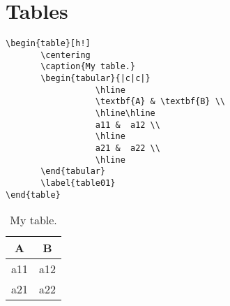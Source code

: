 \chapter{Tables}

\begin{verbatim}
\begin{table}[h!]
       \centering
       \caption{My table.}
       \begin{tabular}{|c|c|}
                  \hline
                  \textbf{A} & \textbf{B} \\
                  \hline\hline
                  a11 &  a12 \\
                  \hline
                  a21 &  a22 \\
                  \hline
       \end{tabular}
       \label{table01}
\end{table}
\end{verbatim}

\begin{table}[h!]
	\centering
	\caption{My table.}
	\begin{tabular}{|c|c|}
	    	\hline
	    	\textbf{A} & \textbf{B} \\
	    	\hline\hline
	    	a11 &  a12 \\
	    	\hline
	    	a21 &  a22 \\
	    	\hline
    \end{tabular}
    \label{table01}
\end{table}
